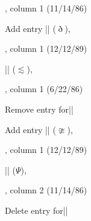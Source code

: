 , column 1 (11/14/86)

Add entry\newline
|\eth| ($\eth$),

, column 1 (12/12/89)

\noindent
|\lesssim| ($\lesssim$),

, column 1 (6/22/86)

Remove entry for\quad |\napprox|

Add entry\newline
|\ncong| ($\ncong$),

, column 1 (12/12/89)

\noindent
|\Psi| ($\Psi$),

, column 2 (11/14/86)

Delete entry for\quad |\thorn|

\enddocument
